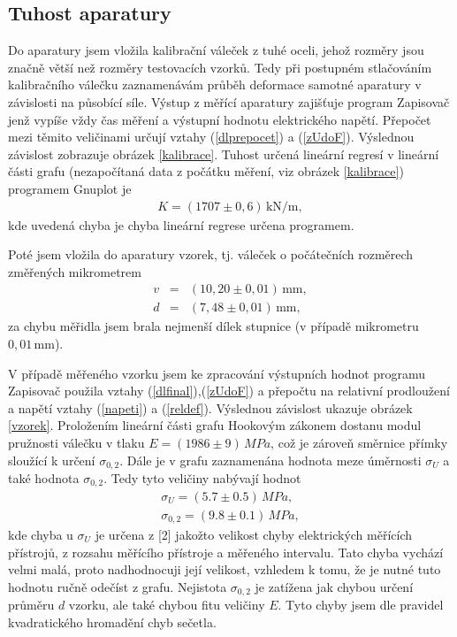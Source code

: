 \documentclass[a4paper,12pt]{article}
\begin{document}
\subsection{Tuhost aparatury}
Do aparatury jsem vložila kalibrační váleček z tuhé oceli, jehož rozměry 
jsou značně větší než rozměry testovacích vzorků. Tedy při postupném 
stlačováním kalibračního válečku zaznamenávám průběh deformace samotné 
aparatury v závislosti na působící síle. Výstup z měřící aparatury 
zajišťuje program Zapisovač jenž vypíše vždy čas měření a výstupní hodnotu
elektrického napětí. Přepočet mezi těmito veličinami určují vztahy (\ref{dlprepocet})
a (\ref{zUdoF}). Výslednou závislost zobrazuje obrázek \ref{kalibrace}. 
Tuhost určená lineární regresí v lineární části grafu (nezapočítaná data z 
počátku měření, viz obrázek \ref{kalibrace}) programem Gnuplot je
\begin{eqnarray}
\nonumber K= (1707 \pm 0,6) \, \mathrm{kN/m},
\end{eqnarray}
kde uvedená chyba je chyba lineární regrese určena programem.

Poté jsem vložila do aparatury vzorek, tj. váleček o počátečních rozměrech 
změřených mikrometrem
\begin{eqnarray}
\nonumber v &=& (10,20 \pm 0,01) \, \mathrm{mm},\\
\nonumber d &=& (7,48 \pm 0,01) \, \mathrm{mm},
\end{eqnarray}
za chybu měřidla jsem brala nejmenší dílek stupnice (v případě mikrometru $0,01 \, \mathrm{mm}$).

V případě měřeného vzorku jsem ke zpracování výstupních hodnot programu Zapisovač 
použila vztahy (\ref{dlfinal}),(\ref{zUdoF}) a přepočtu na relativní 
prodloužení a napětí vztahy (\ref{napeti}) a (\ref{reldef}). Výslednou 
závislost ukazuje obrázek \ref{vzorek}. 
Proložením lineární části grafu Hookovým zákonem dostanu modul pružnosti
válečku v tlaku $E = (1986 \pm 9 ) \, MPa$, což je zároveň směrnice přímky 
sloužící k určení $\sigma_{0,2}$. Dále je v grafu zaznamenána hodnota 
meze úměrnosti $\sigma_U$ a také hodnota $\sigma_{0,2}$.
Tedy tyto veličiny nabývají hodnot
\begin{eqnarray}
\nonumber \sigma_U = (5.7 \pm 0.5) \, MPa , \\
\nonumber \sigma_{0,2} = (9.8 \pm 0.1) \, MPa ,
\end{eqnarray}
kde chyba u $\sigma_U$ je určena z [2] jakožto velikost chyby elektrických
měřících přístrojů, z rozsahu měřícího přístroje a měřeného intervalu. Tato 
chyba vychází velmi malá, proto nadhodnocuji její velikost, vzhledem k tomu, 
že je nutné tuto hodnotu ručně odečíst z grafu.
Nejistota $\sigma_{0,2}$ je zatížena jak chybou určení průměru $d$ vzorku, 
ale také chybou fitu veličiny $E$. Tyto chyby jsem dle pravidel kvadratického 
hromadění chyb sečetla.
\end{document}
